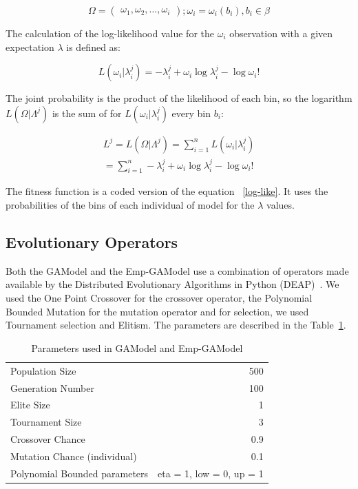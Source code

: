 \begin{equation}
\Omega = 
\begin{pmatrix}
    \omega_1,
    \omega_2,
    \hdots,
    \omega_i
  \end{pmatrix}
  ;\omega_i =\omega_i(b_i),b_i \in \beta
\end{equation}

The calculation of the log-likelihood value for the $\omega_i$
observation with a given expectation $\lambda$ is defined as:


\begin{equation}
	L(\omega_i|\lambda_i^j) = -\lambda_i^j + \omega_i\log\lambda_i^j - \log\omega_i!
\end{equation}

The joint probability is the product of the likelihood of each bin, so
the logarithm $L(\Omega|\Lambda^j)$ is the sum of for
$L(\omega_i|\lambda_i^j)$ every bin $b_i$:

\begin{equation}\label{log-like}
\begin{split}
	L^j = L(\Omega|\Lambda^j) = \sum_{i=1}^{n}L(\omega_i|\lambda_i^j)  \\
	= \sum_{i=1}^{n} -\lambda_i^j + \omega_i\log\lambda_i^j - \log\omega_i!  
\end{split}
\end{equation}

The fitness function is a coded version of the equation
~\ref{log-like}. It uses the probabilities of the bins of each
individual of model for the $\lambda$ values.

\subsection{Evolutionary Operators}
Both the GAModel and the Emp-GAModel use a combination of operators
made available by the Distributed Evolutionary Algorithms in Python
(DEAP)~\cite{DeRainville:2012:DPF:2330784.2330799}. We used the One
Point Crossover for the crossover operator, the Polynomial Bounded
Mutation for the mutation operator and for selection, we used
Tournament selection and Elitism. The parameters are described in the
Table~\ref{GAParameters}.

\begin{table}[!ht]
  \caption{Parameters used in GAModel and Emp-GAModel}
  \label{GAParameters}
  \begin{center}
  \begin{tabular}{|l|r|}
    \hline
    Population Size & 500\\
    Generation Number & 100\\
    Elite Size & 1\\
    Tournament Size & 3\\
    Crossover Chance & 0.9\\
    Mutation Chance (individual) & 0.1\\
	Polynomial Bounded parameters & eta = 1, low = 0, up = 1\\
    \hline    
  \end{tabular}
  \end{center}
\end{table}

